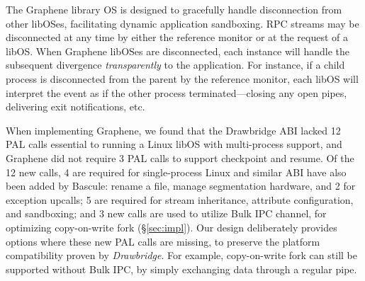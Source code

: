 The Graphene library OS is designed
to gracefully handle disconnection from other libOSes, 
facilitating dynamic application sandboxing.
RPC streams may be disconnected at any time by 
either the reference monitor or at the request of a libOS.
When Graphene libOSes are disconnected, each instance will handle the subsequent
divergence 
{\em transparently} to the application.
For instance, if a child process is disconnected from the parent by the reference monitor,
each libOS will interpret the event as if the other process terminated---closing any open pipes,
delivering exit notifications, etc.



\vspace{5pt}
 When implementing Graphene,
we found that the Drawbridge ABI lacked 12 PAL calls
essential to running a Linux libOS with multi-process support, and 
Graphene did not require 3 PAL calls to support checkpoint and resume.
Of the 12 new calls, 4 are required for single-process Linux and similar ABI have also been added by Bascule:
rename a file, manage segmentation hardware, and 2 for exception upcalls;
5 are required for stream inheritance, attribute configuration, and sandboxing;
and 3 new calls are used to utilize Bulk IPC channel, for optimizing copy-on-write fork (\S\ref{sec:impl}).
Our design deliberately provides options where these new PAL calls are missing, to preserve the platform compatibility proven by {\em Drawbridge}. For example, copy-on-write fork can still be supported without Bulk IPC, by simply exchanging data through a regular pipe.

